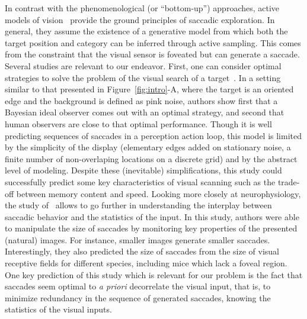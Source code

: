In contrast with the phenomenological (or ``bottom-up'') approaches, active models of vision~\cite{Najemnik05,Butko2010infomax,dauce2018active} provide the ground principles of saccadic exploration. In general, they assume the existence of a generative model from which both the target position and category can be inferred through active sampling. This comes from the constraint that the visual sensor is foveated but can generate a saccade.
Several studies are relevant to our endeavor. First, one can consider optimal strategies to solve the problem of the visual search of a target~\cite{Najemnik05}. In a setting similar to that presented in Figure~\ref{fig:intro}-A, where the target is an oriented edge and the background is defined as pink noise, authors show first that a Bayesian ideal observer comes out with an optimal strategy, and second that human observers are close to that optimal performance. Though it is well predicting sequences of saccades in a perception action loop, this model is limited by the simplicity of the display (elementary edges added on stationary noise, a finite number of non-overlaping locations on a discrete grid) and by the abstract level of modeling. Despite these (inevitable) simplifications, this study could successfully predict some key characteristics of visual scanning such as the trade-off between memory content and speed. Looking more closely at neurophysiology, the study of~\cite{Samonds18} allows to go further in understanding the interplay between saccadic behavior and the statistics of the input. In this study, authors were able to manipulate the size of saccades by monitoring key properties of the presented (natural) images. For instance, smaller images generate smaller saccades. Interestingly, they also predicted the size of saccades from the size of visual receptive fields for different species, including mice which lack a foveal region. One key prediction of this study which is relevant for our problem is the fact that saccades seem optimal to \emph{a priori} decorrelate the visual input, that is, to minimize redundancy in the sequence of generated saccades, knowing the statistics of the visual inputs.

